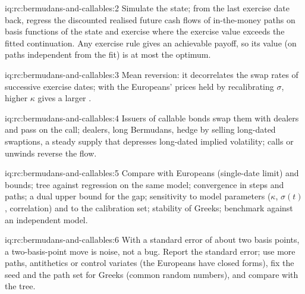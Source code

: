 \begin{solution}{iq:rc:bermudans-and-callables:2}
Simulate the state; from the last exercise date back, regress the discounted
realised future cash flows of in-the-money paths on basis functions of the state
and exercise where the exercise value exceeds the fitted continuation. Any
exercise rule gives an achievable payoff, so its value (on paths independent from
the fit) is at most the optimum.
\end{solution}

\begin{solution}{iq:rc:bermudans-and-callables:3}
Mean reversion: it decorrelates the swap rates of successive exercise dates; with
the Europeans' prices held by recalibrating $\sigma$, higher $\kappa$ gives a larger
.
\end{solution}

\begin{solution}{iq:rc:bermudans-and-callables:4}
Issuers of callable bonds swap them with dealers and pass on the call; dealers,
long Bermudans, hedge by selling long-dated swaptions, a steady supply that
depresses long-dated implied volatility; calls or unwinds reverse the flow.
\end{solution}

\begin{solution}{iq:rc:bermudans-and-callables:5}
Compare with Europeans (single-date limit) and bounds; tree against regression on
the same model; convergence in steps and paths; a dual upper bound for the gap;
sensitivity to model parameters ($\kappa$, $\sigma(t)$, correlation) and to the
calibration set; stability of Greeks; benchmark against an independent model.
\end{solution}

\begin{solution}{iq:rc:bermudans-and-callables:6}
With a standard error of about two basis points, a two-basis-point move is
noise, not a bug. Report the standard error; use more paths, antithetics or
control variates (the Europeans have closed forms), fix the seed and the path
set for Greeks (common random numbers), and compare with the tree.
\end{solution}
